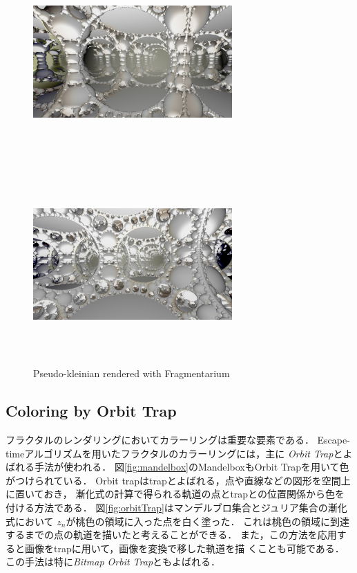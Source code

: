 \begin{figure}[htbp]
 \begin{minipage}{0.5\hsize}
  \center
  \includegraphics[width=3in, height=3in, keepaspectratio]{../img/fractal/pseudoKleinian.pdf}
  \subcaption{}
 \end{minipage}
 \begin{minipage}{0.5\hsize}
  \center
  \includegraphics[width=3in, height=3in,
  keepaspectratio]{../img/fractal/pseudo-kleinian2.pdf}
  \subcaption{}
 \end{minipage}
  \caption{Pseudo-kleinian rendered with Fragmentarium}
  \label{fig:pseudoKleinian}
\end{figure}


\subsection{Coloring by Orbit Trap}

フラクタルのレンダリングにおいてカラーリングは重要な要素である．
Escape-timeアルゴリズムを用いたフラクタルのカラーリングには，主に\textit{
Orbit Trap}とよばれる手法が使われる．
図\ref{fig:mandelbox}のMandelboxもOrbit Trapを用いて色がつけられている．
Orbit trapはtrapとよばれる，点や直線などの図形を空間上に置いておき，
漸化式の計算で得られる軌道の点とtrapとの位置関係から色を付ける方法である．
図\ref{fig:orbitTrap}はマンデルブロ集合とジュリア集合の漸化式において
$z_n$が桃色の領域に入った点を白く塗った．
これは桃色の領域に到達するまでの点の軌道を描いたと考えることができる．
また，この方法を応用すると画像をtrapに用いて，画像を変換で移した軌道を描
くことも可能である．
この手法は特に\textit{Bitmap Orbit Trap}ともよばれる．

